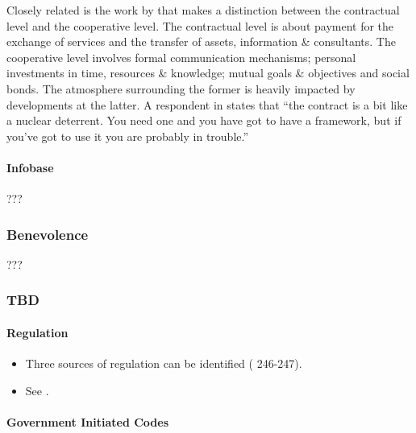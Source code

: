 \documentclass[12pt]{article}
\providecommand{\tightlist}{%
  \setlength{\itemsep}{0pt}\setlength{\parskip}{0pt}}
\begin{document}
Closely related is the work by \citet[9-13]{willcockskern} that makes a
distinction between the contractual level and the cooperative level. The
contractual level is about payment for the exchange of services and the
transfer of assets, information \& consultants. The cooperative level
involves formal communication mechanisms; personal investments in time,
resources \& knowledge; mutual goals \& objectives and social bonds. The
atmosphere surrounding the former is heavily impacted by developments at
the latter. A respondent in \citet[9]{willcockskern} states that ``the
contract is a bit like a nuclear deterrent. You need one and you have
got to have a framework, but if you've got to use it you are probably in
trouble.''

\hypertarget{infobase}{%
\paragraph{Infobase}\label{infobase}}

???

\hypertarget{benevolence}{%
\subsubsection{Benevolence}\label{benevolence}}

???

\hypertarget{tbd}{%
\subsubsection{TBD}\label{tbd}}

\hypertarget{regulation}{%
\paragraph{Regulation}\label{regulation}}

\begin{itemize}
\tightlist
\item
  Three sources of regulation can be identified (\citet{clark1993}
  246-247).
\item
  See \citet[813-817]{muzio2011}.
\end{itemize}

\hypertarget{government-initiated-codes}{%
\paragraph{Government Initiated
Codes}\label{government-initiated-codes}}
\end{document}
